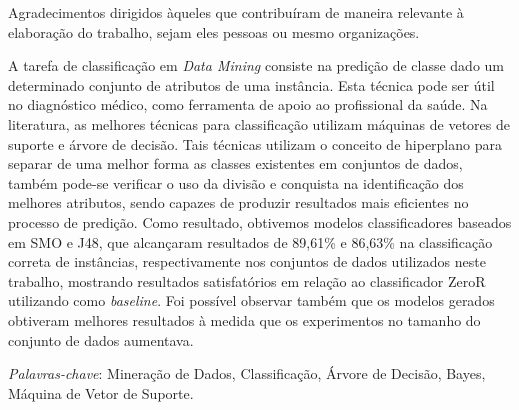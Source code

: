 \documentclass[
	12pt,				%
	openright,			%
	oneside,	
	a4paper,				%
	english,				%
	brazil				%
]{abntex2/abntex2} %
\begin{document}

\begin{agradecimentos}

Agradecimentos dirigidos àqueles que contribuíram de maneira relevante à elaboração do trabalho, sejam eles pessoas ou mesmo organizações.

\end{agradecimentos}







\setlength{\absparsep}{18pt} %
\begin{resumo}

 	A tarefa de classificação em \textit{Data Mining} consiste na predição de classe dado um determinado conjunto de atributos de uma instância. Esta técnica pode ser útil no diagnóstico médico, como ferramenta de apoio ao profissional da saúde. Na literatura, as melhores técnicas para classificação utilizam máquinas de vetores de suporte e árvore de decisão. Tais técnicas utilizam o conceito de hiperplano para separar de uma melhor forma as classes existentes em conjuntos de dados, também pode-se verificar o uso da divisão e conquista na identificação dos melhores atributos, sendo capazes de produzir resultados mais eficientes no processo de predição. Como resultado, obtivemos modelos classificadores baseados em SMO e J48, que alcançaram resultados de 89,61\% e 86,63\% na classificação correta de instâncias, respectivamente nos conjuntos de dados utilizados neste trabalho, mostrando resultados satisfatórios em relação ao classificador ZeroR utilizando como \textit{baseline}. Foi possível observar também que os modelos gerados obtiveram melhores resultados à medida que os experimentos no tamanho do conjunto de dados aumentava.

 \textit{Palavras-chave}: Mineração de Dados, Classificação, Árvore de Decisão, Bayes, Máquina de Vetor de Suporte.

\end{resumo}
\end{document}
